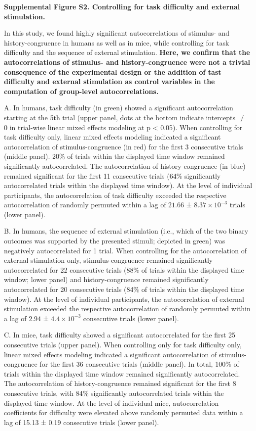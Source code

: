 \documentclass[
]{article}
\begin{document}
\textbf{Supplemental Figure S2. Controlling for task difficulty and
external stimulation.}

In this study, we found highly significant autocorrelations of stimulus-
and history-congruence in humans as well as in mice, while controlling
for task difficulty and the sequence of external stimulation.
\textbf{Here, we confirm that the autocorrelations of stimulus- and
history-congruence were not a trivial consequence of the experimental
design or the addition of tast difficulty and external stimulation as
control variables in the computation of group-level autocorrelations.}

A. In humans, task difficulty (in green) showed a significant
autocorrelation starting at the 5th trial (upper panel, dots at the
bottom indicate intercepts \(\neq\) 0 in trial-wise linear mixed effects
modeling at p \textless{} 0.05). When controlling for task difficulty
only, linear mixed effects modeling indicated a significant
autocorrelation of stimulus-congruence (in red) for the first 3
consecutive trials (middle panel). 20\% of trials within the displayed
time window remained significantly autocorrelated. The autocorrelation
of history-congruence (in blue) remained significant for the first 11
consecutive trials (64\% significantly autocorrelated trials within the
displayed time window). At the level of individual participants, the
autocorrelation of task difficulty exceeded the respective
autocorrelation of randomly permuted within a lag of \(21.66\) ±
\(\ensuremath{8.37\times 10^{-3}}\) trials (lower panel).

B. In humans, the sequence of external stimulation (i.e., which of the
two binary outcomes was supported by the presented stimuli; depicted in
green) was negatively autocorrelated for 1 trial. When controlling for
the autocorrelation of external stimulation only, stimulus-congruence
remained significantly autocorrelated for 22 consecutive trials (88\% of
trials within the displayed time window; lower panel) and
history-congruence remained significantly autocorrelated for 20
consecutive trials (84\% of trials within the displayed time window). At
the level of individual participants, the autocorrelation of external
stimulation exceeded the respective autocorrelation of randomly permuted
within a lag of \(2.94\) ± \(\ensuremath{4.4\times 10^{-3}}\)
consecutive trials (lower panel).

C. In mice, task difficulty showed a significant autocorrelated for the
first 25 consecutive trials (upper panel). When controlling only for
task difficulty only, linear mixed effects modeling indicated a
significant autocorrelation of stimulus-congruence for the first 36
consecutive trials (middle panel). In total, 100\% of trials within the
displayed time window remained significantly autocorrelated. The
autocorrelation of history-congruence remained significant for the first
8 consecutive trials, with 84\% significantly autocorrelated trials
within the displayed time window. At the level of individual mice,
autocorrelation coefficients for difficulty were elevated above randomly
permuted data within a lag of 15.13 ± 0.19 consecutive trials (lower
panel).
\end{document}
